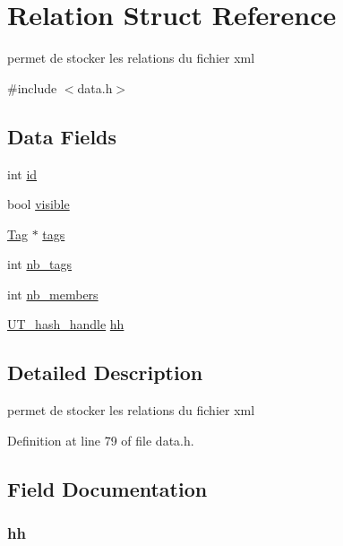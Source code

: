 \hypertarget{struct_relation}{}\section{Relation Struct Reference}
\label{struct_relation}


permet de stocker les relations du fichier xml  




{\ttfamily \#include $<$data.\+h$>$}

\subsection*{Data Fields}
\begin{DoxyCompactItemize}
\item 
int \hyperlink{struct_relation_a7441ef0865bcb3db9b8064dd7375c1ea}{id}
\item 
bool \hyperlink{struct_relation_aa54a57ae048476d840caf6d4d2c47aa3}{visible}
\item 
\hyperlink{struct_tag}{Tag} $\ast$ \hyperlink{struct_relation_a5b3cb60eeefcbc271683754bf243aebb}{tags}
\item 
int \hyperlink{struct_relation_a5090182abe45c6d1577adb6c195378f3}{nb\+\_\+tags}
\item 
int \hyperlink{struct_relation_abe6a73091b8a8c9432bf4b149925229d}{nb\+\_\+members}
\item 
\hyperlink{struct_u_t__hash__handle}{U\+T\+\_\+hash\+\_\+handle} \hyperlink{struct_relation_a67d3d81a4f9a9622b0befade8d131661}{hh}
\end{DoxyCompactItemize}


\subsection{Detailed Description}
permet de stocker les relations du fichier xml 

Definition at line 79 of file data.\+h.



\subsection{Field Documentation}
\subsubsection[{\texorpdfstring{hh}{hh}}]{ hh}\hypertarget{struct_relation_a67d3d81a4f9a9622b0befade8d131661}{}\label{struct_relation_a67d3d81a4f9a9622b0befade8d131661}


